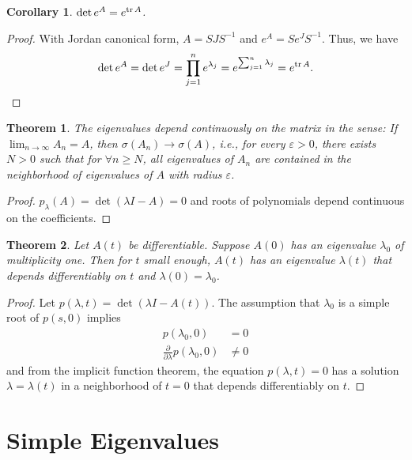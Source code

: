 \documentclass[11pt]{book}
\newtheorem{theorem}{Theorem}[section]
\newtheorem{corollary}{Corollary}[section]
\theoremstyle{definition}
\numberwithin{equation}{subsection}
\begin{document}
\medskip

\begin{corollary}
$\det e^A = e^{\tr A}$.
\end{corollary}
\begin{proof}
With Jordan canonical form, $A = SJS^{-1}$ and $e^A = Se^JS^{-1}$. Thus, we have
\begin{align*}
    \det e^A = \det e^J = \prod^n_{j=1} e^{\lambda_j} = e^{\sum^n_{j=1}\lambda_j} = e^{\tr A}.
\end{align*}
\end{proof}

\medskip

\begin{theorem}
The eigenvalues depend continuously on the matrix in the sense: If $\lim_{n\to\infty}A_n = A$, then $\sigma(A_n)\to \sigma(A)$, i.e., for every $\varepsilon > 0$, there exists $N > 0$ such that for $\forall n\geq N$, all eigenvalues of $A_n$ are contained in the neighborhood of eigenvalues of $A$ with radius $\varepsilon$.
\end{theorem}
\begin{proof}
$p_\lambda(A) = \det(\lambda I - A) = 0$ and roots of polynomials depend continuous on the coefficients.
\end{proof}

\medskip

\begin{theorem}
Let $A(t)$ be differentiable. Suppose $A(0)$ has an eigenvalue $\lambda_0$ of multiplicity one. Then for $t$ small enough, $A(t)$ has an eigenvalue $\lambda(t)$ that depends differentiably on $t$ and $\lambda(0) = \lambda_0$.
\end{theorem}
\begin{proof}
Let $p(\lambda, t) = \det (\lambda I - A(t))$. The assumption that $\lambda_0$ is a simple root of $p(s,0)$ implies 
\begin{align*}
    p(\lambda_0,0) & = 0 \\
    \frac{\partial}{\partial \lambda}p(\lambda_0,0) & \neq 0
\end{align*}
and from the implicit function theorem, the equation $p(\lambda,t) = 0$ has a solution $\lambda = \lambda(t)$ in a neighborhood of $t=0$ that depends differentiably on $t$.
\end{proof}

\medskip

\section{Simple Eigenvalues}
\end{document}
